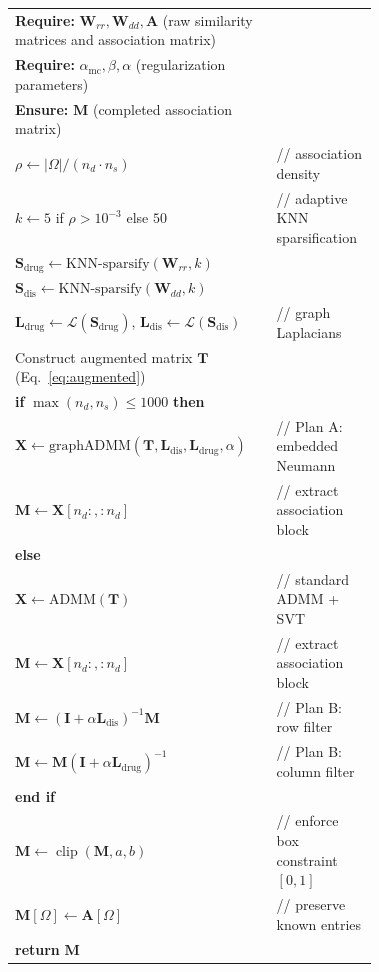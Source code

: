 \documentclass[webpdf,modern,large]{oup-authoring-template}
\newcounter{algline}
\begin{document}
\begin{algorithm}[htbp]
\caption{SGRMC: Sparsified Graph-Regularized Matrix Completion}
\label{alg:sgrmc}
\small
\setlength{\tabcolsep}{0pt}
\begin{tabular}{@{\stepcounter{algline}\thealgline.\quad}p{0.50\linewidth}@{\quad}p{0.22\linewidth}@{}}
\textbf{Require:} $\mathbf{W}_{rr}, \mathbf{W}_{dd}, \mathbf{A}$ (raw similarity matrices and association matrix) & \\
\textbf{Require:} $\alpha_{\text{mc}}, \beta, \alpha$ (regularization parameters) & \\
\textbf{Ensure:} $\mathbf{M}$ (completed association matrix) & \\
$\rho \gets |\Omega| / (n_d \cdot n_s)$ & // association density \\
$k \gets 5$ if $\rho > 10^{-3}$ else $50$ & // adaptive KNN sparsification \\
$\mathbf{S}_{\text{drug}} \gets \text{KNN-sparsify}(\mathbf{W}_{rr}, k)$ & \\
$\mathbf{S}_{\text{dis}} \gets \text{KNN-sparsify}(\mathbf{W}_{dd}, k)$ & \\
$\mathbf{L}_{\text{drug}} \gets \mathcal{L}(\mathbf{S}_{\text{drug}})$, $\mathbf{L}_{\text{dis}} \gets \mathcal{L}(\mathbf{S}_{\text{dis}})$ & // graph Laplacians \\
Construct augmented matrix $\mathbf{T}$ (Eq.~\eqref{eq:augmented}) & \\
\textbf{if} $\max(n_d, n_s) \le 1000$ \textbf{then} & \\
\quad $\mathbf{X} \gets \text{graphADMM}(\mathbf{T},\allowbreak \mathbf{L}_{\text{dis}},\allowbreak \mathbf{L}_{\text{drug}},\allowbreak \alpha)$ & // Plan A: embedded Neumann \\
\quad $\mathbf{M} \gets \mathbf{X}[n_d:, :n_d]$ & // extract association block \\
\textbf{else} & \\
\quad $\mathbf{X} \gets \text{ADMM}(\mathbf{T})$ & // standard ADMM + SVT \\
\quad $\mathbf{M} \gets \mathbf{X}[n_d:, :n_d]$ & // extract association block \\
\quad $\mathbf{M} \gets (\mathbf{I} + \alpha\mathbf{L}_{\text{dis}})^{-1}\mathbf{M}$ & // Plan B: row filter \\
\quad $\mathbf{M} \gets \mathbf{M}(\mathbf{I} + \alpha\mathbf{L}_{\text{drug}})^{-1}$ & // Plan B: column filter \\
\textbf{end if} & \\
$\mathbf{M} \gets \operatorname{clip}(\mathbf{M}, a, b)$ & // enforce box constraint $[0,1]$ \\
$\mathbf{M}[\Omega] \gets \mathbf{A}[\Omega]$ & // preserve known entries \\
\textbf{return} $\mathbf{M}$ & \\
\end{tabular}
\end{algorithm}
\end{document}
